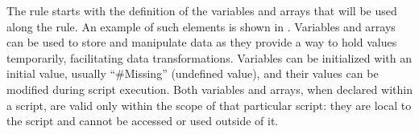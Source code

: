 \documentclass[12pt,a4paper,openright,twoside]{book}
\begin{document}


The rule starts with the definition of the variables and arrays that will be used along the rule.
%
An example of such elements is shown in .
%
Variables and arrays can be used to store and manipulate data as they provide a way to hold values temporarily, facilitating data transformations.
%
Variables can be initialized with an initial value, usually ``\#Missing'' (undefined value), and their values can be modified during script execution.
%
Both variables and arrays, when declared within a script, are valid only within the scope of that particular script: they are local to the script and cannot be accessed or used outside of it.


\end{document}

